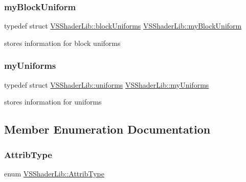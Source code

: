 \subsubsection{\texorpdfstring{my\+Block\+Uniform}{myBlockUniform}}
{\footnotesize\ttfamily typedef struct \hyperlink{struct_v_s_shader_lib_1_1block_uniforms}{V\+S\+Shader\+Lib\+::block\+Uniforms}  \hyperlink{class_v_s_shader_lib_a0543003357c93b57bfe99a9aa3e0898d}{V\+S\+Shader\+Lib\+::my\+Block\+Uniform}\hspace{0.3cm}{\ttfamily [protected]}}



stores information for block uniforms 

\mbox{\label{class_v_s_shader_lib_a3302b287e0686235d57404bd4587c1e6}} 
\subsubsection{\texorpdfstring{my\+Uniforms}{myUniforms}}
{\footnotesize\ttfamily typedef struct \hyperlink{struct_v_s_shader_lib_1_1uniforms}{V\+S\+Shader\+Lib\+::uniforms} \hyperlink{class_v_s_shader_lib_a3302b287e0686235d57404bd4587c1e6}{V\+S\+Shader\+Lib\+::my\+Uniforms}\hspace{0.3cm}{\ttfamily [protected]}}



stores information for uniforms 



\subsection{Member Enumeration Documentation}
\mbox{\label{class_v_s_shader_lib_ac4141d01d0c856c9ca456e51afd9a2c5}} 
\subsubsection{\texorpdfstring{Attrib\+Type}{AttribType}}
{\footnotesize\ttfamily enum \hyperlink{class_v_s_shader_lib_ac4141d01d0c856c9ca456e51afd9a2c5}{V\+S\+Shader\+Lib\+::\+Attrib\+Type}}



